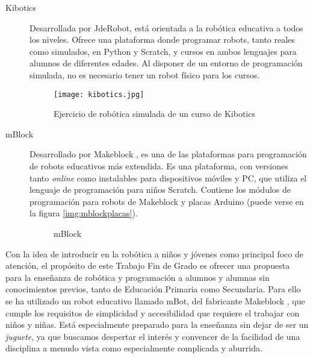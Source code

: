 \begin{description}
	\item [Kibotics]\cite{kibotics} Desarrollada por JdeRobot, está orientada a la robótica educativa a todos los niveles. Ofrece una plataforma donde programar robots, tanto reales como simulados, en Python y Scratch, y cursos en ambos lenguajes para alumnos de diferentes edades. Al disponer de un entorno de programación simulada, no es necesario tener un robot físico para los cursos. 
	\begin{figure}[h]
		\centering
		\texttt{[image: kibotics.jpg]}
		\caption{Ejercicio de robótica simulada de un curso de Kibotics}
		\label{img:kibotics}
	\end{figure}
	\item [mBlock]\cite{mblock} Desarrollado por Makeblock \cite{makeblock}, es una de las plataformas para programación de robots educativos más extendida. Es una plataforma, con versiones tanto \textit{online} como instalables para dispositivos móviles y PC, que utiliza el lenguaje de programación para niños Scratch. Contiene los módulos de programación para robots de Makeblock y placas Arduino (puede verse en la figura \ref{img:mblockplacas}).
	
	\begin{figure}[h]
		\centering
		\begin{subfigure}
			[Versión online de mBlock] {
				\texttt{[image: mblockweb.jpg]}
				\label{img:mblockonline}
			}
		\end{subfigure}
		\begin{subfigure}
			[Placas base y robots disponibles en mBlock] {
				\texttt{[image: mblockPlacas.png]}
				\label{img:mblockplacas}
			}
		\end{subfigure}
		\caption{mBlock}		
	\end{figure}

	
\end{description}
\vspace{2cm}
\par Con la idea de introducir en la robótica a niños y jóvenes como principal foco de atención, el propósito de este Trabajo Fin de Grado es ofrecer una propuesta para la enseñanza de robótica y programación a alumnos y alumnas sin conocimientos previos, tanto de Educación Primaria como Secundaria. Para ello se ha utilizado un robot educativo llamado mBot, del fabricante Makeblock \cite{makeblock}, que cumple los requisitos de simplicidad y accesibilidad que requiere el trabajar con niños y niñas. Está especialmente preparado para la enseñanza sin dejar de ser un \textit{juguete}, ya que buscamos despertar el interés y convencer de la facilidad de una disciplina a menudo vista como especialmente complicada y aburrida.

